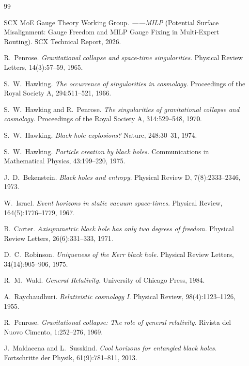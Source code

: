 \documentclass[12pt,a4paper]{article}
\theoremstyle{remark}
\begin{document}
\begin{thebibliography}{99}

SCX MoE Gauge Theory Working Group.
\textit{——MILP} (Potential Surface Misalignment: Gauge Freedom and MILP Gauge Fixing in Multi-Expert Routing).
SCX Technical Report, 2026.

R.~Penrose.
\textit{Gravitational collapse and space-time singularities.}
Physical Review Letters, 14(3):57--59, 1965.

S.~W.~Hawking.
\textit{The occurrence of singularities in cosmology.}
Proceedings of the Royal Society A, 294:511--521, 1966.

S.~W.~Hawking and R.~Penrose.
\textit{The singularities of gravitational collapse and cosmology.}
Proceedings of the Royal Society A, 314:529--548, 1970.

S.~W.~Hawking.
\textit{Black hole explosions?}
Nature, 248:30--31, 1974.

S.~W.~Hawking.
\textit{Particle creation by black holes.}
Communications in Mathematical Physics, 43:199--220, 1975.

J.~D.~Bekenstein.
\textit{Black holes and entropy.}
Physical Review D, 7(8):2333--2346, 1973.

W.~Israel.
\textit{Event horizons in static vacuum space-times.}
Physical Review, 164(5):1776--1779, 1967.

B.~Carter.
\textit{Axisymmetric black hole has only two degrees of freedom.}
Physical Review Letters, 26(6):331--333, 1971.

D.~C.~Robinson.
\textit{Uniqueness of the Kerr black hole.}
Physical Review Letters, 34(14):905--906, 1975.

R.~M.~Wald.
\textit{General Relativity.}
University of Chicago Press, 1984.

A.~Raychaudhuri.
\textit{Relativistic cosmology I.}
Physical Review, 98(4):1123--1126, 1955.

R.~Penrose.
\textit{Gravitational collapse: The role of general relativity.}
Rivista del Nuovo Cimento, 1:252--276, 1969.

J.~Maldacena and L.~Susskind.
\textit{Cool horizons for entangled black holes.}
Fortschritte der Physik, 61(9):781--811, 2013.


\end{thebibliography}
\end{document}
